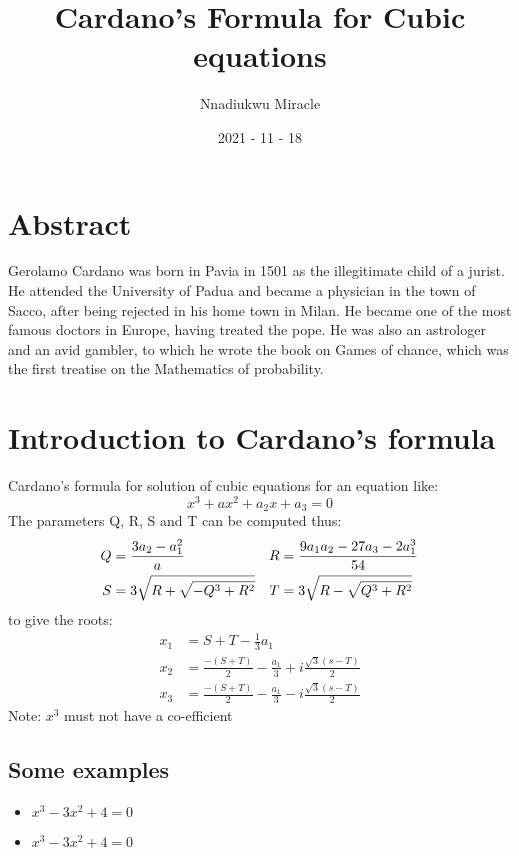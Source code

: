 \documentclass{article}
\title{Cardano's Formula for Cubic equations}
\date{2021 - 11 - 18}
\author{Nnadiukwu Miracle}
\begin{document}
	\maketitle
\centering
	\section*{Abstract}
	Gerolamo Cardano was born in Pavia in 1501 as the illegitimate child of a jurist. He attended the University of Padua and became a physician in the town of Sacco, after being rejected in his home town in Milan. He became one of the most famous doctors in Europe,  having treated the pope. He was also an astrologer and an avid gambler, to which he wrote the book on Games of chance, which was the first treatise on the Mathematics of probability.\cite{elsevier}
	\centering
	\section*{Introduction to Cardano's formula}
	Cardano's formula for solution of cubic equations for an equation like:
		\begin{equation*}
		x^3 + ax^2 + a_2x + a_3 = 0
	\end{equation*}
	The parameters Q, R, S and T can be computed thus:
		\begin{align*}
			Q &=\dfrac{3a_2 - a^2_1}{a}  	&R &= \frac{9a_1a_2 - 27a_3 - 2a^3_1}{54}\\
			\linebreak
			S &=3\sqrt{R + \sqrt{-Q^3 + R^2}}  &T &= 3\sqrt{R - \sqrt{Q^3 + R^2}}	\\		
		\end{align*}
to give the roots:
\begin{align*} 
	x_1 &=	S + T - \frac{1}{3}a_1\\
	x_2 &=	\frac{-(S + T)}{2} - \frac{a_1}{3} + i\frac{\sqrt{3}(s - T)}{2}\\
	x_3 &=	\frac{-(S + T)}{2} - \frac{a_1}{3} - i\frac{\sqrt{3}(s - T)}{2}
\end{align*} 
Note: $x^3$ must not have a co-efficient
\subsection*{Some examples}
\begin{itemize}
	\item $x^3 - 3x^2 + 4 = 0$
	\item $x^3 - 3x^2 + 4 = 0$
\end{itemize}


	
	
\end{document}
